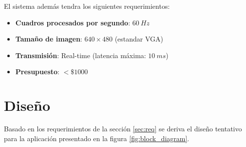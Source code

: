 \documentclass[10pt, letterpaper, conference]{IEEEtran}
\begin{document}
El sistema además tendra los siguientes requerimientos:

\begin{itemize}
  \item \textbf{Cuadros procesados por segundo}: $60\ Hz$
  \item \textbf{Tamaño de imagen}: $640\times480$ (estandar VGA)
  \item \textbf{Transmisión}: Real-time (latencia máxima: $10\ ms$)
  \item \textbf{Presupuesto}: $< \$ 1000$
\end{itemize}


\section{Diseño}
\label{sec:design}

Basado en los requerimientos de la sección \ref{sec:req} se deriva el diseño tentativo para la aplicación 
presentado en la figura \ref{fig:block_diagram}.
\end{document}
